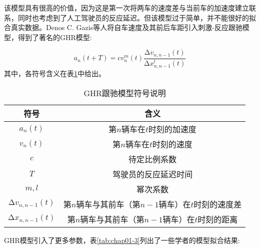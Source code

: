 该模型具有很高的价值，因为这是第一次将两车的速度差与当前车的加速度建立联系，同时也考虑到了人工驾驶员的反应延迟。但该模型过于简单，并不能很好的拟合真实数据。Denos C. Gazis等人将自车速度及其前后车距引入刺激-反应跟驰模型，得到了著名的GHR模型\cite{Gazis1961NonlinearFM}:

\begin{equation}
  a_n(t+T) = cv_n^m(t)\frac{\increment{v_{n, n-1}}(t)}{\increment{x_{n, n-1}^l}(t)}
  \label{eq:chap01-2}
\end{equation}
其中，各符号含义在表\ref{tab:chap01-2}中给出。

\begin{table}
  \centering
  \caption{GHR跟驰模型符号说明}
  \begin{tabular}{cc}
    \toprule
    符号          &  含义                         \\
    \midrule
    $a_n(t)$   & 第$n$辆车在$t$时刻的加速度         \\
    $v_n(t)$   & 第$n$辆车在$t$时刻的速度         \\
    $c$        & 待定比例系数                    \\
    $T$        & 驾驶员的反应延迟时间  \\
    $m, l$        & 幂次系数         \\
    $\increment{v_{n, n-1}}(t)$  &  第$n$辆车与其前车（第$n-1$辆车）在$t$时刻的速度差   \\
    $\increment{x_{n, n-1}}(t)$  &  第$n$辆车与其前车（第$n-1$辆车）在$t$时刻的距离   \\
    \bottomrule
  \end{tabular}
  \label{tab:chap01-2}
\end{table}

GHR模型引入了更多参数，表\ref{tab:chap01-3}列出了一些学者的模型拟合结果:


